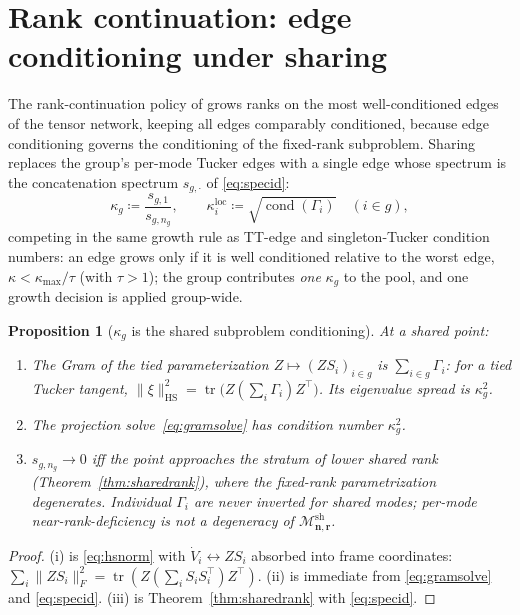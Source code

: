 \documentclass[11pt]{article}
\newtheorem{proposition}[theorem]{Proposition}
\theoremstyle{definition}
\theoremstyle{remark}
\newcommand{\tr}{\operatorname{tr}}
\newcommand{\HS}{\mathrm{HS}}
\newcommand{\cond}{\operatorname{cond}}
\newcommand{\Msh}{\mathcal{M}^{\mathrm{sh}}_{\boldsymbol{n},\boldsymbol{r}}}
\begin{document}
\section{Rank continuation: edge conditioning under sharing}\label{sec:cont}

The rank-continuation policy of \cite{T4S} grows ranks on the most
well-conditioned edges of the tensor network, keeping all edges comparably
conditioned, because edge conditioning governs the conditioning of the
fixed-rank subproblem. Sharing replaces the group's per-mode Tucker edges
with a single edge whose spectrum is the concatenation spectrum
$s_{g,\cdot}$ of \eqref{eq:specid}:
\[
\kappa_g \coloneqq \frac{s_{g,1}}{s_{g,n_g}},
\qquad
\kappa^{\mathrm{loc}}_i \coloneqq \sqrt{\cond(\Gamma_i)}
\quad (i \in g),
\]
competing in the same growth rule as TT-edge and singleton-Tucker condition
numbers: an edge grows only if it is well conditioned relative to the worst
edge, $\kappa < \kappa_{\max}/\tau$ (with $\tau > 1$); the group contributes
\emph{one} $\kappa_g$ to the pool, and one growth decision is applied
group-wide.

\begin{proposition}[$\kappa_g$ is the shared subproblem conditioning]
\label{prop:kappa}
At a shared point:
\begin{enumerate}[label=(\roman*),itemsep=1pt,topsep=2pt]
\item The Gram of the tied parameterization $Z \mapsto (ZS_i)_{i \in g}$ is
  $\sum_{i\in g}\Gamma_i$: for a tied Tucker tangent,
  $\|\xi\|_{\HS}^2 = \tr\bigl(Z (\sum_i \Gamma_i) Z^\top\bigr)$. Its
  eigenvalue spread is $\kappa_g^2$.
\item The projection solve~\eqref{eq:gramsolve} has condition number
  $\kappa_g^2$.
\item $s_{g,n_g} \to 0$ iff the point approaches the stratum of lower shared
  rank (Theorem~\ref{thm:sharedrank}), where the fixed-rank parametrization
  degenerates. Individual $\Gamma_i$ are never inverted for shared modes;
  per-mode near-rank-deficiency is not a degeneracy of $\Msh$.
\end{enumerate}
\end{proposition}

\begin{proof}
(i) is \eqref{eq:hsnorm} with $\dot V_i \leftrightarrow ZS_i$ absorbed into
frame coordinates: $\sum_i \|ZS_i\|_F^2 = \tr(Z(\sum_i S_iS_i^\top)Z^\top)$.
(ii) is immediate from \eqref{eq:gramsolve} and \eqref{eq:specid}. (iii) is
Theorem~\ref{thm:sharedrank} with \eqref{eq:specid}.
\end{proof}
\end{document}
